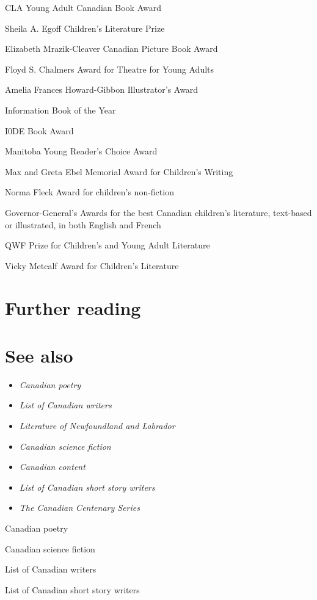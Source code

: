 CLA Young Adult Canadian Book Award

Sheila A. Egoff Children's Literature Prize

Elizabeth Mrazik-Cleaver Canadian Picture Book Award

Floyd S. Chalmers Award for Theatre for Young Adults

Amelia Frances Howard-Gibbon Illustrator's Award

Information Book of the Year

I0DE Book Award

Manitoba Young Reader's Choice Award

Max and Greta Ebel Memorial Award for Children's Writing

Norma Fleck Award for children's non-fiction

Governor-General's Awards for the best Canadian children's literature,
text-based or illustrated, in both English and French

QWF Prize for Children's and Young Adult Literature

Vicky Metcalf Award for Children's Literature

\section{Further reading}\label{further-reading}

\section{See also}\label{see-also}

\begin{itemize}
\item
  \emph{Canadian poetry}
\item
  \emph{List of Canadian writers}
\item
  \emph{Literature of Newfoundland and Labrador}
\item
  \emph{Canadian science fiction}
\item
  \emph{Canadian content}
\item
  \emph{List of Canadian short story writers}
\item
  \emph{The Canadian Centenary Series}
\end{itemize}

Canadian poetry

Canadian science fiction

List of Canadian writers

List of Canadian short story writers

